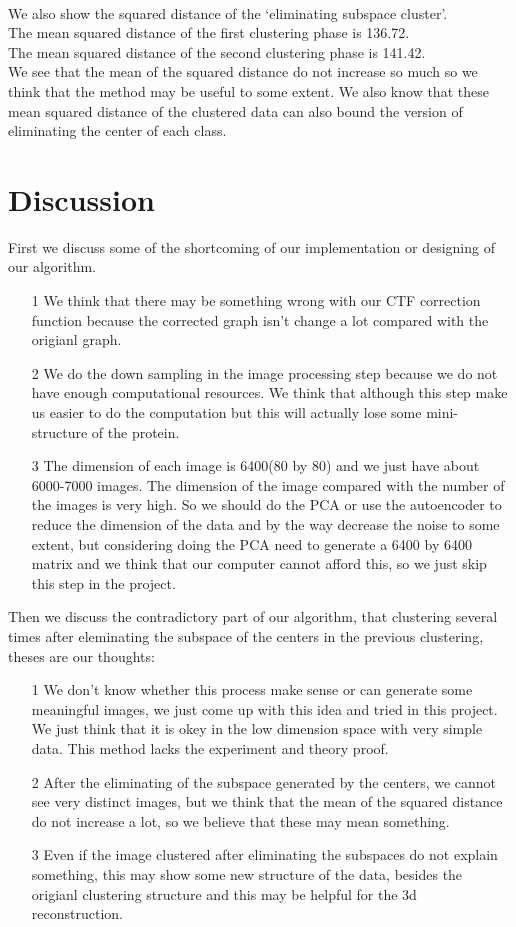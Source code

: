 \documentclass{article}
\begin{document}
~\\
We also show the squared distance of the `eliminating subspace cluster'.\\
The mean squared distance of the first clustering phase is 136.72.\\
The mean squared distance of the second clustering phase is 141.42.\\
We see that the mean of the squared distance do not increase so much so we think that the method may be useful to some extent. We also know that these mean squared distance of the clustered data can also bound the version of eliminating the center of each class.\\


\section{Discussion}
First we discuss some of the shortcoming of our implementation or designing of our algorithm.
\begin{enumerate}
\item[1] We think that there may be something wrong with our CTF correction function because the corrected graph isn't change a lot compared with the origianl graph. 
\item[2] We do the down sampling in the image processing step because we do not have enough computational resources. We think that although this step make us easier to do the computation but this will actually lose some mini-structure of the protein.
\item[3] The dimension of each image is 6400(80 by 80) and we just have about 6000-7000 images. The dimension of the image compared with the number of the images is very high. So we should do the PCA or use the autoencoder to reduce the dimension of the data and by the way decrease the noise to some extent, but considering doing the PCA need to generate a 6400 by 6400 matrix and we think that our computer cannot afford this, so we just skip this step in the project.
\end{enumerate}

Then we discuss the contradictory part of our algorithm, that clustering several times after eleminating the subspace of the centers in the previous clustering, theses are our thoughts:
\begin{enumerate}
\item[1] We don't know whether this process make sense or can generate some meaningful images, we just come up with this idea and tried in this project. We just think that it is okey in the low dimension space with very simple data. This method lacks the experiment and theory proof.
\item[2] After the eliminating of the subspace generated by the centers, we cannot see very distinct images, but we think that the mean of the squared distance do not increase a lot, so we believe that these may mean something.
\item[3] Even if the image clustered after eliminating the subspaces do not explain something, this may show some new structure of the data, besides the origianl clustering structure and this may be helpful for the 3d reconstruction.
\end{enumerate}
\end{document}
